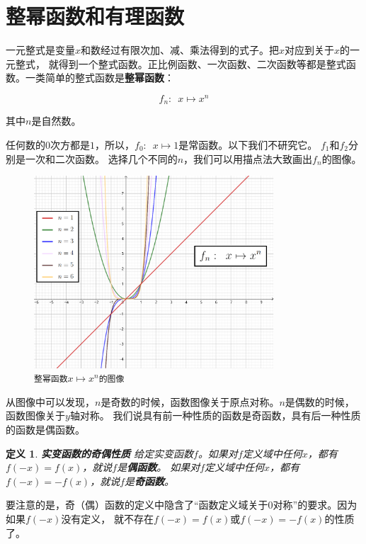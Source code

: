 \documentclass[12pt,UTF8]{ctexbook}
\newtheorem{df}{定义}[section]
\begin{document}
\section{整幂函数和有理函数}

一元整式是变量$x$和数经过有限次加、减、乘法得到的式子。把$x$对应到关于$x$的一元整式，
就得到一个整式函数。正比例函数、一次函数、二次函数等都是整式函数。一类简单的整式函数是\textbf{整幂函数}：

$$f_n: \,\,\, x \mapsto x^n$$

其中$n$是自然数。

任何数的$0$次方都是$1$，所以，$f_0:\,\,\, x\mapsto 1$是常函数。以下我们不研究它。
$f_1$和$f_2$分别是一次和二次函数。
选择几个不同的$n$，我们可以用描点法大致画出$f_n$的图像。

\begin{figure}[h]
    \vspace{4pt}
    \centering
    \includegraphics[width=0.8\textwidth]{tu/整幂函数1.png}
    \caption*{\texttt{整幂函数}$x\mapsto x^n$\texttt{的图像}}
\end{figure}

从图像中可以发现，$n$是奇数的时候，函数图像关于原点对称。$n$是偶数的时候，函数图像关于$y$轴对称。
我们说具有前一种性质的函数是奇函数，具有后一种性质的函数是偶函数。
\begin{df}\textbf{实变函数的奇偶性质}
    给定实变函数$f$。如果对$f$定义域中任何$x$，都有$f(-x) = f(x)$，就说$f$是\textbf{偶函数}。
如果对$f$定义域中任何$x$，都有$f(-x) = -f(x)$，就说$f$是\textbf{奇函数}。
\end{df}

要注意的是，奇（偶）函数的定义中隐含了“函数定义域关于$0$对称”的要求。因为如果$f(-x)$没有定义，
就不存在$f(-x) = f(x)$或$f(-x) = -f(x)$的性质了。
\end{document}
